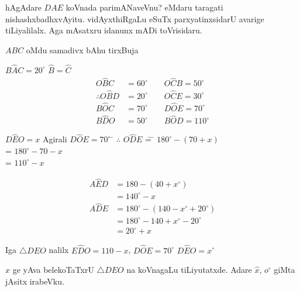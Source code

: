 hAgAdare $DAE$ koVnada parimANaveVnu? eMdaru taragati nishashxbadhxvAyitu. vidAyxthiRgaLu eSuTx parxyatinxsidarU avarige tiLiyalilalx. Aga mAsatxru idanunx mADi toVrisidaru.

$ABC$ \quad oMdu samadivx bAhu tirxBuja

$B\hat{A}C=20^\circ$ \qquad $\hat{B}=\hat{C}$
\begin{align*}
O\hat{B}C &=60^\circ  \qquad O\hat{C}B =50^\circ\\
\therefore O\hat{B}D  &=20^\circ  \qquad O\hat{C}E =30^\circ\\
B\hat{O}C &=70^\circ   \qquad D\hat{O}E =70^\circ\\
B\hat{D}O &=50^\circ   \qquad B\hat{O}D =110^\circ
\end{align*}

\begin{tabbing}
$D\hat{E}O=x$  \; \; Agirali \;\; $D\hat{O}E=70^\circ$ \;\; \= $\therefore$ \;\; $O\hat{D}E$ \= = \= $180^\circ-(70+x)$\\
\> \> = \> $180^\circ-70-x$\\
\> \> = \> $110^\circ-x$
\end{tabbing}
\begin{align*}
A\hat{E}D &=180-(40+x^\circ)\\
&=140^\circ-x\\
A\hat{D}E & =180^\circ-(140-x^\circ+20^\circ)\\
&=180^\circ-140+x^\circ-20^\circ\\
& =20^\circ+x
\end{align*}

Iga \quad $\bigtriangleup DEO$ \quad nalilx \quad $E\hat{D}O=110-x$, \quad $D\hat{O}E=70^\circ$ \quad $D\hat{E}O=x^\circ$

$x$ ge yAva belekoTaTxrU \quad $\bigtriangleup DEO$ \quad na koVnagaLu tiLiyutatxde. Adare \quad $\hat{x}$, \quad $o^\circ$ giMta jAsitx irabeVku.
